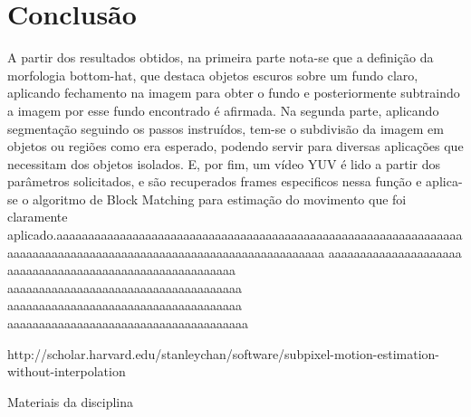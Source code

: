 \documentclass[journal]{IEEEtran}
\begin{document}
\begin{figure}[h]
\centering
{}
\end{figure}

\newpage
\section{Conclusão}
A partir dos resultados obtidos, na primeira parte nota-se que a definição da morfologia bottom-hat, que destaca objetos escuros sobre um fundo claro, aplicando fechamento na imagem para obter o fundo e posteriormente subtraindo a imagem por esse fundo encontrado é afirmada. Na segunda parte, aplicando segmentação seguindo os passos instruídos, tem-se o subdivisão da imagem em objetos ou regiões como era esperado, podendo servir para diversas aplicações que necessitam dos objetos isolados. E, por fim, um vídeo YUV é lido a partir dos parâmetros solicitados, e são recuperados frames especificos nessa função e aplica-se o algoritmo de Block Matching para estimação do movimento que foi claramente aplicado.aaaaaaaaaaaaaaaaaaaaaaaaaaaaaaaaaaaaaaaaaaaaaaaaaaaaaaaaaaaaaaaaaaaaaaaaaaaaaaaaaaaaaaaaaaaaaaaaaaaaaaaaaaaaaaaaaa
aaaaaaaaaaaaaaaaaaaaa
aaaaaaaaaaaaaaaaaaaaaaaaaaaaaaaaaaaa
aaaaaaaaaaaaaaaaaaaaaaaaaaaaaaaaaaaaa
aaaaaaaaaaaaaaaaaaaaaaaaaaaaaaaaaaaaa
aaaaaaaaaaaaaaaaaaaaaaaaaaaaaaaaaaaaaa


\begin{thebibliography}{1}


http://scholar.harvard.edu/stanleychan/software/subpixel-motion-estimation-without-interpolation

Materiais da disciplina

\end{thebibliography}
\end{document}
